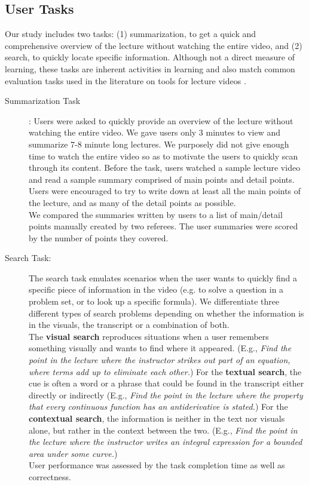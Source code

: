 \subsection {User Tasks}
Our study includes two tasks: (1) summarization, to get a quick and comprehensive overview of the lecture without watching the entire video, and (2) search, to quickly locate specific information.
Although not a direct measure of learning, these tasks are inherent activities in learning and also match common evaluation tasks used in the literature on tools for lecture videos \cite{kim2014data,pavel2014video,monserrat2013notevideo}.\\
%
\begin{description}
\item[Summarization Task]: Users were asked to quickly provide an overview of the lecture without watching the entire video. We gave users only 3 minutes to view and summarize 7-8 minute long lectures. We purposely did not give enough time to watch the entire video so as to motivate the users to quickly scan through its content. Before the task, users watched a sample lecture video and read a sample summary comprised of main points and detail points. Users were encouraged to try to write down at least all the main points of the lecture, and as many of the detail points as possible.\\
%
We compared the summaries written by users to a  list of main/detail points manually created by two referees. The user summaries were scored by the number of points they covered.
%
\item[Search Task:] The search task emulates scenarios when the user wants to quickly find a specific piece of information in the video (e.g. to solve a question in a problem set, or to look up a specific formula). We differentiate three different types of search problems 
depending on whether the information is in the visuals, the transcript or a combination of both.\\ 
The \textbf{visual search} reproduces situations when a user remembers something visually and wants to find where it appeared. (E.g., \textit{Find the point in the lecture where the instructor strikes out part of an equation, where terms add up to eliminate each other.}) For the \textbf{textual search}, the cue is often a word or a phrase that could be found in the transcript either directly or indirectly (E.g., \textit{Find the point in the lecture where the property that every continuous function has an antiderivative is stated.}) For the \textbf{contextual search}, the information is neither in the text nor visuals alone, but rather in the context between the two. (E.g., \textit{Find the point in the lecture where the instructor writes an integral expression for a bounded area under some curve.})\\
User performance was assessed by the task completion time as well as correctness.
\end{description}


